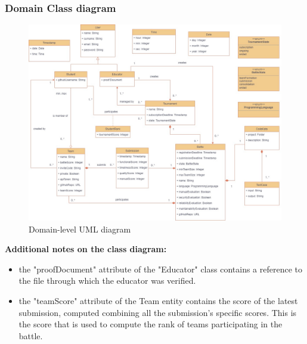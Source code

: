 \begin{enumerate}[label=\textbf{\arabic*}.]
\end{enumerate}

\subsubsection{Domain Class diagram}
\begin{figure}[H]
    \hspace{-98px}
    \includegraphics[scale=0.5]{Diagrams/uml_v2.jpg}
    \caption{Domain-level UML diagram}
    \label{class_diagram}
\end{figure}
\newpage
\textbf{ Additional notes on the class diagram:}
\begin{itemize}
    \item the "proofDocument" attribute of the "Educator" class contains a reference to the file through which the educator was verified.
    \item the "teamScore" attribute of the Team entity contains the score of the latest submission, computed combining all the submission's specific scores. This is the score that is used to compute the rank of teams participating in the battle.
\end{itemize}

